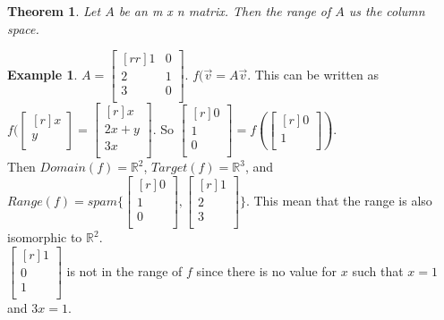 \documentclass{report}
\theoremstyle{plain}
\newtheorem*{thrm}{Theorem}
\theoremstyle{definition}
\newtheorem*{ex}{Example}
\theoremstyle{plain}
\begin{document}
\begin{thrm}
Let $A$ be an m x n matrix. Then the range of $A$ us the column space.
\end{thrm}
\begin{ex}
$A=\begin{bmatrix}[rr]1&0\\2&1\\3&0\\\end{bmatrix}$. $f(\vec{v} = A\vec{v}$. This can be written as$f(\begin{bmatrix}[r]x\\y\\\end{bmatrix} = \begin{bmatrix}[r]x\\2x+y\\3x\\\end{bmatrix}$. So $\begin{bmatrix}[r]0\\1\\0\\\end{bmatrix} = f(\begin{bmatrix}[r]0\\1\\\end{bmatrix})$.\\
Then $Domain(f)=\mathbb{R}^2$, $Target(f)=\mathbb{R}^3$, and $Range(f)= spam\{\begin{bmatrix}[r]0\\1\\0\\\end{bmatrix},\begin{bmatrix}[r]1\\2\\3\\\end{bmatrix}\}$. This mean that the range is also isomorphic to $\mathbb{R}^2$.\\
$\begin{bmatrix}[r]1\\0\\1\\\end{bmatrix}$ is not in the range of $f$ since there is no value for $x$ such that $x=1$ and $3x=1$.\\


\end{ex}
\end{document}
